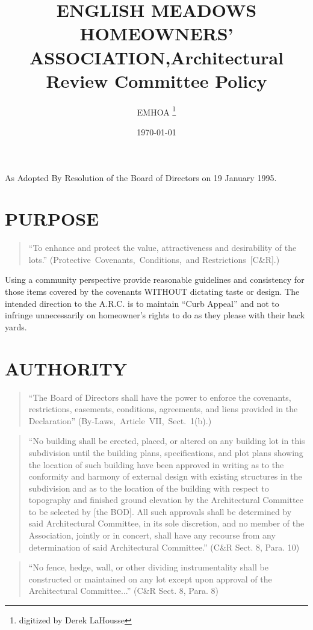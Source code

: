 \documentclass[10pt, letterpaper]{article}
\title{ENGLISH MEADOWS HOMEOWNERS' ASSOCIATION,\linebreak[0] Architectural Review Committee Policy}
\author{EMHOA \thanks{digitized by Derek LaHousse}}
\date{\today}
\begin{document}
\maketitle

As Adopted By Resolution of the Board of Directors on 19 January 1995.

\section{PURPOSE}
\begin{quote}
  ``To enhance and protect the value, attractiveness and desirability of the lots.''
  \hfill (Protective~Covenants,~Conditions,~and Restrictions~[C\&R].)
\end{quote}
Using a community perspective provide reasonable guidelines and consistency for those items covered by the covenants WITHOUT dictating taste or design.
The intended direction to the A.R.C. is to maintain ``Curb Appeal'' and not to infringe unnecessarily on homeowner's rights to do as they please with their back yards.

\section{AUTHORITY}
\begin{quote}
  ``The Board of Directors shall have the power to enforce the covenants, restrictions, easements, conditions, agreements, and liens provided in the Declaration''
  \hfill (By-Laws,~Article~VII,~Sect.~1(b).)
\end{quote}
\begin{quote}
  ``No building shall be erected, placed, or altered on any building lot in this subdivision until the building plans, specifications, and plot plans showing the location of such building have been approved in writing as to the conformity and harmony of external design with existing structures in the subdivision and as to the location of the building with respect to topography and finished ground elevation by the Architectural Committee to be selected by [the BOD].
  All such approvals shall be determined by said Architectural Committee, in its sole discretion, and no member of the Association, jointly or in concert, shall have any recourse from any determination of said Architectural Committee.''
  \hfill (C\&R Sect. 8, Para. 10)
\end{quote}
\begin{quote}
  ``No fence, hedge, wall, or other dividing instrumentality shall be constructed or maintained on any lot except upon approval of the Architectural Committee...''
  \hfill (C\&R Sect. 8, Para. 8)
\end{quote}
\end{document}
